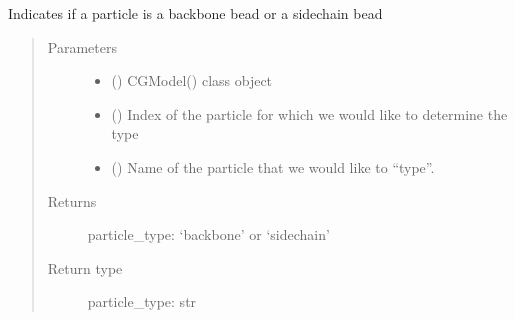 \documentclass[letterpaper,12pt,english,openany,oneside]{sphinxmanual}
\begin{document}
\begin{fulllineitems}
\begin{fulllineitems}
\end{fulllineitems}


\begin{fulllineitems}
\label{\detokenize{cg_model:cg_model.cgmodel.CGModel.get_particle_type}}
Indicates if a particle is a backbone bead or a sidechain bead
\begin{quote}\begin{description}
\item[{Parameters}] \leavevmode\begin{itemize}
\item {} 
 () \textendash{} CGModel() class object

\item {} 
 () \textendash{} Index of the particle for which we would like to determine the type

\item {} 
 () \textendash{} Name of the particle that we would like to “type”.

\end{itemize}

\item[{Returns}] \leavevmode
particle\_type: ‘backbone’ or ‘sidechain’

\item[{Return type}] \leavevmode
particle\_type: str

\end{description}\end{quote}

\end{fulllineitems}



\end{fulllineitems}
\end{document}
